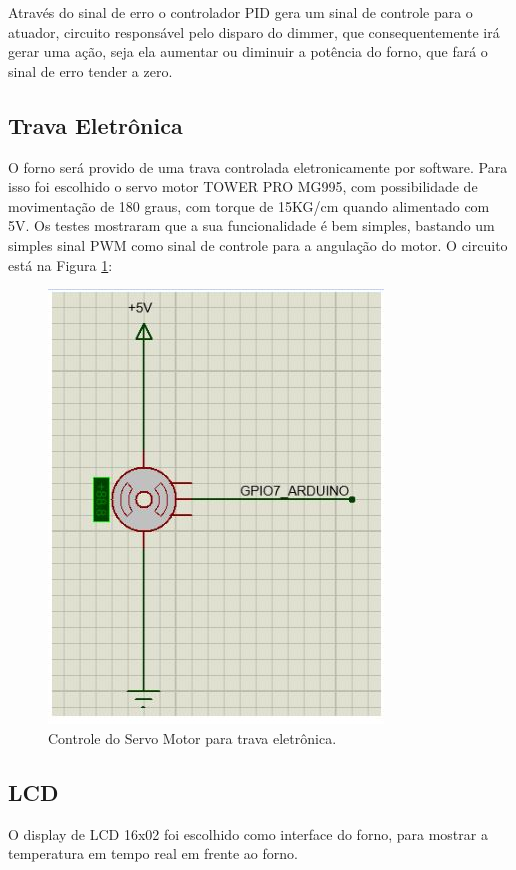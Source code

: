 Através do sinal de erro o controlador PID gera um sinal de controle para o atuador, circuito responsável pelo disparo do dimmer, que consequentemente irá gerar uma ação, seja ela aumentar ou diminuir a potência do forno, que fará o sinal de erro tender a zero. 

\subsection{Trava Eletrônica}
O forno será provido de uma trava controlada eletronicamente por software. Para isso foi escolhido o servo motor TOWER PRO MG995, com possibilidade de movimentação de 180 graus, com torque de 15KG/cm quando alimentado com 5V.  Os testes mostraram que a sua funcionalidade é bem simples, bastando um simples sinal PWM como sinal de controle para a angulação do motor. O circuito está na Figura \ref{trava}:

\begin{figure}[H]
	\centering
	\label{trava}
	\includegraphics[keepaspectratio=true,scale=0.7]{figuras/trava.JPG}
	\caption{Controle do Servo Motor para trava eletrônica.}
\end{figure}

\subsection{LCD}
O display de LCD 16x02 foi escolhido como interface do forno, para mostrar a temperatura em tempo real em frente ao forno. 

